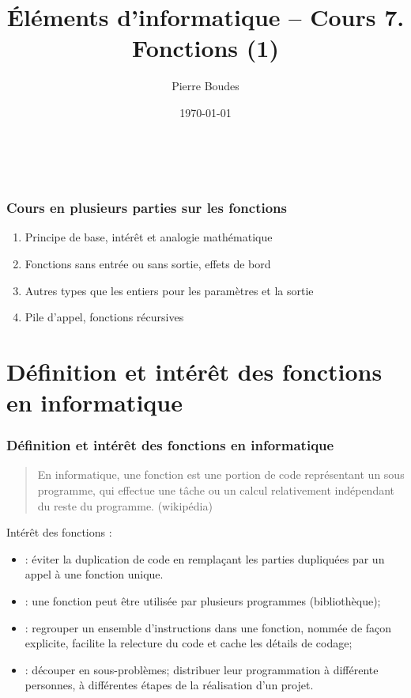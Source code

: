 \documentclass[xcolor=pdftex,svgnames,table]{beamer}
\title{Éléments d'informatique -- Cours 7. Fonctions (1)}
\author{Pierre Boudes}
\date{\today}
\begin{document}
\begin{frame}
	\titlepage
	\vfill
	\begin{center}
		\\[2.5ex]
		{\tiny\CcNote{\CcLongnameByNcSa}}
		\vspace*{-2.5ex}
	\end{center}
\end{frame}



\begin{frame}
  \frametitle{Cours en plusieurs parties sur les fonctions \nowrite}

\begin{enumerate}
    \item Principe de base, intérêt et analogie mathématique
    \item Fonctions sans entrée ou sans sortie, effets de bord
    \item Autres types que les entiers pour les paramètres et la sortie
    \item Pile d'appel, fonctions récursives
  \end{enumerate}
\end{frame}

\section[Plan]{}


\section[Introduction]{Définition et intérêt des fonctions en informatique}
\begin{frame}
  \frametitle{Définition et intérêt des fonctions en informatique}
  \begin{quote}
    En informatique, une fonction est une portion de code représentant
    un sous programme, qui effectue une tâche ou un calcul
    relativement indépendant du reste du programme. (wikipédia)
  \end{quote}
\pause
Intérêt des fonctions  :
  \begin{itemize}
  \item {} : éviter la duplication de code en
    remplaçant les parties dupliquées par un appel à une fonction
    unique.\pause
    \item {} : une fonction peut être utilisée
      par plusieurs programmes (bibliothèque);\pause
    \item {} : regrouper un ensemble
      d'instructions dans une fonction, nommée de façon explicite,
      facilite la relecture du code et cache les détails de codage;\pause
    \item {} : découper en sous-problèmes;
      distribuer leur programmation à différente personnes, à
      différentes étapes de la réalisation d'un projet.\pause
  \end{itemize}
\end{frame}
\end{document}
